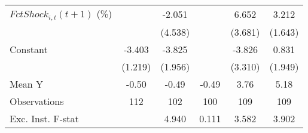 {\begin{tabular}{l*{5}{c}}
\addlinespace
$ FctShock_{i,t}(t+1)$ (\%)&                     &      -2.051         &                     &       6.652\sym{*}  &       3.212\sym{*}  \\
                    &                     &     (4.538)         &                     &     (3.681)         &     (1.643)         \\
\addlinespace
Constant            &      -3.403\sym{**} &      -3.825\sym{*}  &                     &      -3.826         &       0.831         \\
                    &     (1.219)         &     (1.956)         &                     &     (3.310)         &     (1.949)         \\
\midrule
Mean Y              &       -0.50         &       -0.49         &       -0.49         &        3.76         &        5.18         \\
Observations        &         112         &         102         &         100         &         109         &         109         \\
Exc. Inst. F-stat   &                     &       4.940         &       0.111         &       3.582         &       3.902         \\
\bottomrule
\end{tabular}
}
